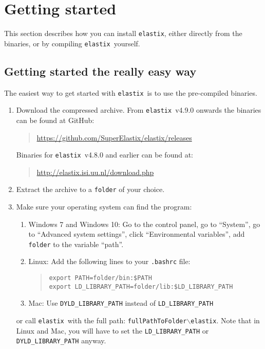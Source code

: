 \documentclass[]{report}
\newcommand{\elastix}{\texttt{elastix}}
\begin{document}
\section{Getting started}\label{sec:elastix:install}

This section describes how you can install \elastix, either directly
from the binaries, or by compiling \elastix\ yourself.

\subsection{Getting started the really easy way}

The easiest way to get started with \elastix\ is to use the
pre-compiled binaries.
\begin{enumerate}
\item Download the compressed archive. From \elastix\ v4.9.0 onwards
the binaries can be found at GitHub:
    \begin{quote}
    \url{https://github.com/SuperElastix/elastix/releases}
    \end{quote}

Binaries for \elastix\ v4.8.0 and earlier can be found at:
    \begin{quote}
    \url{http://elastix.isi.uu.nl/download.php}
    \end{quote}

\item Extract the archive to a \texttt{folder} of your choice.

\item Make sure your operating system can find the program:
    \begin{enumerate}
    \item Windows 7 and Windows 10: Go to the control panel, go to ``System'', go to
    ``Advanced system settings'', click ``Environmental variables'',
    add \texttt{folder} to the variable ``path''.

    \item Linux: Add the following lines to your \texttt{.bashrc} file:
       \begin{quote}
       \texttt{export PATH=folder/bin:\$PATH}\\
       \texttt{export LD\_LIBRARY\_PATH=folder/lib:\$LD\_LIBRARY\_PATH}
       \end{quote}

    \item Mac: Use \texttt{DYLD\_LIBRARY\_PATH} instead of \texttt{LD\_LIBRARY\_PATH}

    \end{enumerate}
    or call \elastix\ with the full path:
    \texttt{fullPathToFolder$\backslash$elastix}. Note that in Linux and Mac, you
    will have to set the \texttt{LD\_LIBRARY\_PATH} or \texttt{DYLD\_LIBRARY\_PATH} anyway.
\end{enumerate}
\end{document}
